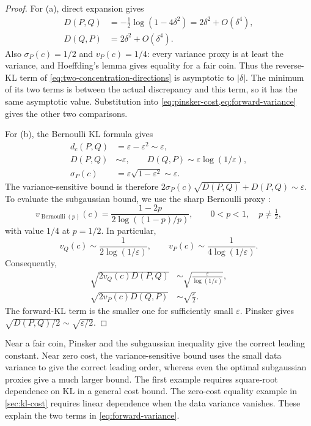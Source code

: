 \documentclass[11pt,twoside]{article}
\newcommand{\KL}{D}
\theoremstyle{definition}
\theoremstyle{remark}
\begin{document}
\begin{proof}
For (a), direct expansion gives
\[
 \begin{aligned}
 \KL(P, Q)&=-\tfrac12\log(1-4\delta^2)
     =2\delta^2+O(\delta^4),\\
 \KL(Q, P)&=2\delta^2+O(\delta^4).
 \end{aligned}
\]
Also \(\sigma_P(c)=1/2\) and \(v_P(c)=1/4\): every variance proxy
is at least the variance, and Hoeffding's lemma gives equality for a
fair coin. Thus the reverse-KL term of
\cref{eq:two-concentration-directions} is asymptotic to
\(|\delta|\). The minimum of its two terms is between the actual
discrepancy and this term, so it has the same asymptotic value.
Substitution into \cref{eq:pinsker-cost,eq:forward-variance} gives
the other two comparisons.

For (b), the Bernoulli KL formula gives
\[
 \begin{aligned}
 d_c(P,Q)&=\varepsilon-\varepsilon^2\sim\varepsilon,\\
 \KL(P, Q)&\sim\varepsilon,\qquad
 \KL(Q, P)\sim\varepsilon\log(1/\varepsilon),\\
 \sigma_P(c)&=\varepsilon\sqrt{1-\varepsilon^2}\sim\varepsilon.
 \end{aligned}
\]
The variance-sensitive bound is therefore
\(2\sigma_P(c)\sqrt{\KL(P, Q)}+\KL(P, Q)
\sim\varepsilon\).
To evaluate the subgaussian bound, we use the sharp Bernoulli proxy
\citep[Eq.~(1.1) and Theorem~1.1]{schlemm2014}:
\[
 v_{\operatorname{Bernoulli}(p)}(c)
 =\frac{1-2p}{2\log((1-p)/p)},\qquad
 0<p<1,\quad p\ne\tfrac12,
\]
with value \(1/4\) at \(p=1/2\).
In particular,
\[
 v_Q(c)\sim\frac1{2\log(1/\varepsilon)},\qquad
 v_P(c)\sim\frac1{4\log(1/\varepsilon)}.
\]
Consequently,
\[
 \begin{aligned}
 \sqrt{2v_Q(c)\KL(P, Q)}
    &\sim\sqrt{\frac{\varepsilon}{\log(1/\varepsilon)}},\\
 \sqrt{2v_P(c)\KL(Q, P)}
    &\sim\sqrt{\frac{\varepsilon}{2}}.
 \end{aligned}
\]
The forward-KL term is the smaller one for sufficiently small
\(\varepsilon\). Pinsker gives \(\sqrt{\KL(P, Q)/2}
\sim\sqrt{\varepsilon/2}\).
\end{proof}

Near a fair coin, Pinsker and the subgaussian inequality give the
correct leading constant. Near zero cost, the variance-sensitive bound
uses the small data variance to give the correct leading order, whereas
even the optimal subgaussian proxies give a much larger bound.
The first example requires square-root dependence on KL in a general
cost bound. The zero-cost equality example in
\cref{sec:kl-cost} requires linear dependence when the data variance
vanishes. These explain the two terms in \cref{eq:forward-variance}.
\end{document}
